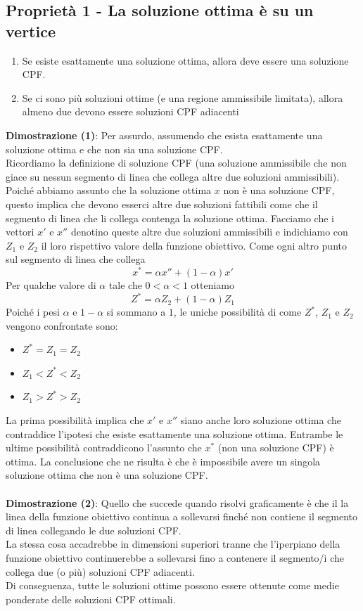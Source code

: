 \documentclass[12pt,a4paper]{article}
\begin{document}
\subsection{Proprietà 1 - La soluzione ottima è su un vertice}
\begin{enumerate}
\item Se esiste esattamente una soluzione ottima, allora deve essere una soluzione CPF.
\item Se ci sono più soluzioni ottime (e una regione ammissibile limitata), allora almeno due devono essere soluzioni CPF adiacenti
\end{enumerate}
\textbf{Dimostrazione (1)}: Per assurdo, assumendo che esista esattamente una soluzione ottima e che non sia una soluzione CPF.\\
Ricordiamo la definizione di soluzione CPF (una soluzione ammissibile che non giace su nessun segmento di linea che collega altre due soluzioni ammissibili). Poiché abbiamo assunto che la soluzione ottima $x$ non è una soluzione CPF, questo implica che devono esserci altre due soluzioni fattibili come che il segmento di linea che li collega contenga la soluzione ottima. Facciamo che i vettori $x'$ e $x''$ denotino queste altre due soluzioni ammissibili e indichiamo con $Z_1$ e $Z_2$ il loro rispettivo valore della funzione obiettivo. Come ogni altro punto sul segmento di linea che collega 
$$x^*=\alpha x''+(1-\alpha)x'$$
Per qualche valore di $\alpha$ tale che $0<\alpha < 1$ otteniamo
$$Z^*=\alpha Z_2 + (1-\alpha) Z_1$$
Poiché i pesi $\alpha$ e $1-\alpha$ si sommano a $1$, le uniche possibilità di come $Z^*$, $Z_1$ e $Z_2$ vengono confrontate sono:
\begin{itemize}
\item $Z^* = Z_1 = Z_2$
\item $Z_1 < Z^* < Z_2$
\item $Z_1 > Z^* > Z_2$
\end{itemize}
La prima possibilità implica che $x'$ e $x''$ siano anche loro soluzione ottima che contraddice l'ipotesi che esiste esattamente una soluzione ottima. Entrambe le ultime possibilità contraddicono l'assunto che $x^*$ (non una soluzione CPF) è ottima. La conclusione che ne risulta è che è impossibile avere un singola soluzione ottima che non è una soluzione CPF.\\
\\
\textbf{Dimostrazione (2)}: Quello che succede quando risolvi graficamente è che il la linea della funzione obiettivo continua a sollevarsi finché non contiene il segmento di linea collegando le due soluzioni CPF.\\
La stessa cosa accadrebbe in dimensioni superiori tranne che l'iperpiano della funzione obiettivo continuerebbe a sollevarsi fino a contenere il segmento/i che collega due (o più) soluzioni CPF adiacenti.\\
Di conseguenza, tutte le soluzioni ottime possono essere ottenute come medie ponderate delle soluzioni CPF ottimali.\\
\end{document}

